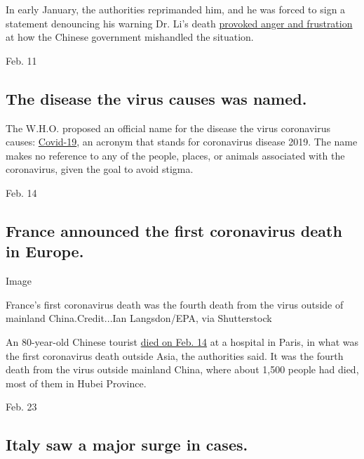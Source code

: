 In early January, the authorities reprimanded him, and he was forced to
sign a statement denouncing his warning Dr. Li's death
\href{https://www.nytimes3xbfgragh.onion/2020/02/07/business/china-coronavirus-doctor-death.html}{provoked
anger and frustration} at how the Chinese government mishandled the
situation.

Feb. 11

\hypertarget{the-disease-the-virus-causes-was-named}{%
\subsection{The disease the virus causes was
named.}\label{the-disease-the-virus-causes-was-named}}

The W.H.O. proposed an official name for the disease the virus
coronavirus causes:
\href{https://www.nytimes3xbfgragh.onion/2020/02/11/world/asia/coronavirus-china.html?action=click\&module=Top\%20Stories\&pgtype=Homepage}{Covid-19},
an acronym that stands for coronavirus disease 2019. The name makes no
reference to any of the people, places, or animals associated with the
coronavirus, given the goal to avoid stigma.

Feb. 14

\hypertarget{france-announced-the-first-coronavirus-death-in-europe}{%
\subsection{France announced the first coronavirus death in
Europe.}\label{france-announced-the-first-coronavirus-death-in-europe}}

Image

France's first coronavirus death was the fourth death from the virus
outside of mainland China.Credit...Ian Langsdon/EPA, via Shutterstock

An 80-year-old Chinese tourist
\href{https://www.nytimes3xbfgragh.onion/2020/02/15/world/asia/coronavirus-china-live-updates.html?action=click\&module=Top\%20Stories\&pgtype=Homepage\#link-313a84de}{died
on Feb. 14} at a hospital in Paris, in what was the first coronavirus
death outside Asia, the authorities said. It was the fourth death from
the virus outside mainland China, where about 1,500 people had died,
most of them in Hubei Province.

Feb. 23

\hypertarget{italy-saw-a-major-surge-in-cases}{%
\subsection{Italy saw a major surge in
cases.}\label{italy-saw-a-major-surge-in-cases}}

